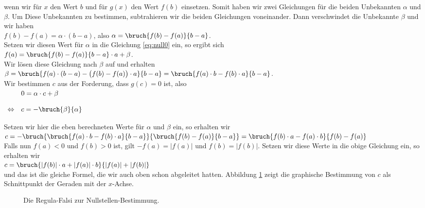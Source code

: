wenn wir f\"ur $x$ den Wert $b$ und f\"ur $g(x)$ den Wert $f(b)$ einsetzen.  Somit haben wir zwei
Gleichungen f\"ur die beiden Unbekannten $\alpha$ und $\beta$.  Um Diese Unbekannten zu bestimmen,
subtrahieren wir die beiden Gleichungen voneinander.  Dann verschwindet die Unbekannte $\beta$ und wir haben
\\[0.2cm]
\hspace*{1.3cm}
   $f(b) - f(a) = \alpha \cdot (b-a)$, \quad also \quad $\alpha = \bruch{f(b) - f(a)}{b-a}$.
\\[0.2cm]
Setzen wir diesen Wert f\"ur $\alpha$ in die Gleichung \ref{eq:null0} ein, so ergibt sich
\\[0.2cm]
\hspace*{1.3cm}
  $f(a) = \bruch{f(b) - f(a)}{b-a} \cdot a + \beta$.
\\[0.2cm]
Wir l\"osen diese Gleichung nach $\beta$ auf und erhalten
\\[0.2cm]
\hspace*{1.3cm}
 $\beta = \bruch{f(a)\cdot (b-a) - \bigl(f(b) - f(a)\bigr)\cdot a}{b-a} = \bruch{f(a)\cdot b - f(b)\cdot a}{b-a}$. 
\\[0.2cm]
 Wir bestimmen $c$ aus der Forderung, dass $g(c) = 0$ ist, also
\\[0.2cm]
\hspace*{1.3cm}
$
\begin{array}[t]{ll}
                & 0 = \alpha \cdot c + \beta \\[0.4cm]
\Leftrightarrow & c = - \bruch{\beta}{\alpha} \\[0.4cm]
\end{array}
$
\\[0.2cm]
Setzen wir hier die eben berechneten Werte f\"ur $\alpha$ und $\beta$ ein, so erhalten wir
\\[0.2cm]
\hspace*{1.3cm}
$c = - \bruch{\bruch{f(a)\cdot b - f(b)\cdot a}{b-a}}{\bruch{f(b) - f(a)}{b-a}} = 
   \bruch{f(b)\cdot a - f(a)\cdot b}{f(b) - f(a)}$
\\[0.2cm]
Falls nun $f(a) < 0$ und $f(b) > 0$ ist, gilt $-f(a) = |f(a)|$ und $f(b) = |f(b)|$.
Setzen wir diese Werte in die obige Gleichung ein, so erhalten wir
\\[0.2cm]
\hspace*{1.3cm}
$c  = \bruch{|f(b)|\cdot a + |f(a)|\cdot b}{|f(a)| + |f(b)|}$
\\[0.2cm] 
und das ist die gleiche Formel, die wir auch oben schon abgeleitet hatten.
Abbildung \ref{fig:regula-falsi} zeigt die graphische Bestimmung von $c$
als Schnittpunkt der Geraden mit der $x$-Achse.
\begin{figure}[!h]
  \centering
   \caption{Die Regula-Falsi zur Nullstellen-Bestimmung.}
  \label{fig:regula-falsi}
\end{figure}


